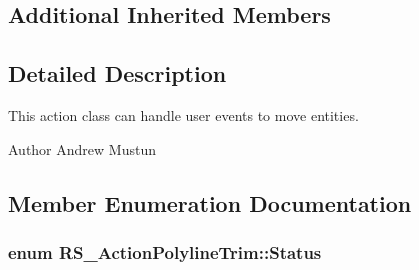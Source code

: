 \subsection*{Additional Inherited Members}


\subsection{Detailed Description}
This action class can handle user events to move entities.

\begin{DoxyAuthor}{Author}
Andrew Mustun 
\end{DoxyAuthor}


\subsection{Member Enumeration Documentation}
\hypertarget{classRS__ActionPolylineTrim_aae6f7dce1bf9306a4d1dcfec21b13ca0}{
\subsubsection[{Status}]{\setlength{\rightskip}{0pt plus 5cm}enum {\bf R\-S\-\_\-\-Action\-Polyline\-Trim\-::\-Status}}}\label{classRS__ActionPolylineTrim_aae6f7dce1bf9306a4d1dcfec21b13ca0}
